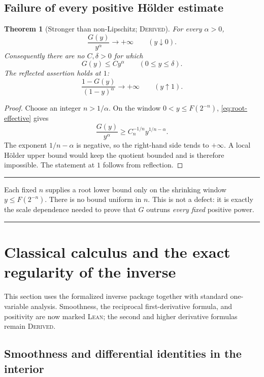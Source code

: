 \documentclass[11pt,oneside]{article}
\newtheorem{theorem}{Theorem}[section]
\theoremstyle{definition}
\theoremstyle{remark}
\newenvironment{boxedremark}{%
  \par\smallskip\noindent\begin{center}\begin{minipage}{0.94\textwidth}%
  \color{black}\hrule\vspace{0.6em}\small
}{%
  \vspace{0.6em}\hrule\end{minipage}\end{center}\smallskip
}
\newcommand{\InvF}{G}
\newcommand{\Formalized}{\textsc{Lean}}
\newcommand{\Derived}{\textsc{Derived}}
\begin{document}
\subsection{Failure of every positive Hölder estimate}

\begin{theorem}[Stronger than non-Lipschitz; \Derived]
\label{thm:no-holder}
For every $\alpha>0$,
\[
 \frac{\InvF(y)}{y^\alpha}\longrightarrow+\infty
 \qquad (y\downarrow0).
\]
Consequently there are no $C,\delta>0$ for which
\[
 \InvF(y)\leq Cy^\alpha\qquad(0\leq y\leq\delta).
\]
The reflected assertion holds at $1$:
\[
 \frac{1-\InvF(y)}{(1-y)^\alpha}\longrightarrow+\infty
 \qquad (y\uparrow1).
\]
\end{theorem}

\begin{proof}
Choose an integer $n>1/\alpha$.  On the window
$0<y\leq F(2^{-n})$, \cref{eq:root-effective} gives
\[
 \frac{\InvF(y)}{y^\alpha}
 \geq C_n^{-1/n}y^{1/n-\alpha}.
\]
The exponent $1/n-\alpha$ is negative, so the right-hand side tends to
$+\infty$.  A local Hölder upper bound would keep the quotient bounded and
is therefore impossible.  The statement at $1$ follows from reflection.
\end{proof}

\begin{boxedremark}
Each fixed $n$ supplies a root lower bound only on the shrinking window
$y\leq F(2^{-n})$.  There is no bound uniform in $n$.  This is not a
defect: it is exactly the scale dependence needed to prove that
$\InvF$ outruns \emph{every fixed} positive power.
\end{boxedremark}


\section{Classical calculus and the exact regularity of the inverse}
\label{sec:inverse-calculus}

This section uses the formalized inverse package together with standard
one-variable analysis.  Smoothness, the reciprocal first-derivative formula,
and positivity are now marked \Formalized; the second and higher derivative
formulas remain \Derived.

\subsection{Smoothness and differential identities in the interior}
\end{document}
